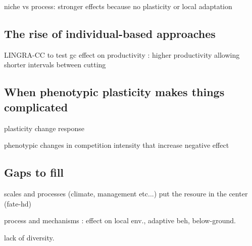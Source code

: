 niche vs process: stronger effects because no plasticity or local adaptation \cite{morin_comparing_2009}
\subsection{The rise of individual-based approaches}

LINGRA-CC \cite{rodriguez_lingra-cc:_1999} to test gc effect on productivity : higher productivity allowing shorter intervals between cutting




\subsection{When phenotypic plasticity makes things complicated}

plasticity change response \cite{morin_comparing_2009}

phenotypic changes in competition intensity that increase negative effect \parencite{hanel_phenotypic_2015}

\subsection{Gaps to fill}

scales and processes (climate, management etc...)
put the resoure in the center (fate-hd)

process and mechanisms
\parencite{berger_competition_2008}: effect on local env., adaptive beh, below-ground.

lack of diversity. 


